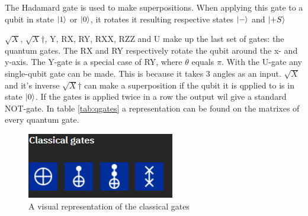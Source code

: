 The Hadamard gate is used to make superpositions. When applying this gate to a qubit in state $\ket{1}$ or $\ket{0}$, it rotates it resulting respective states $\ket{-}$ and $\ket{+S}$

$\sqrt{X}$, $\sqrt{X}$$\dagger$, Y, RX, RY, RXX, RZZ and U make up the last set of gates: the quantum gates. 
The RX and RY respectively rotate the qubit around the x- and y-axis. The Y-gate is a special case of RY, where $\theta$ equals $\pi$.
With the U-gate any single-qubit gate can be made. This is because it takes 3 angles as an input.
$\sqrt{X}$ and it's inverse $\sqrt{X}$$\dagger$ can make a superposition if the qubit it is qpplied to is in state $\ket{0}$. If the gates is applied twice in a row the output wil give a standard NOT-gate.
In table \ref{tab:qgates} a representation can be found on the matrixes of every quantum gate.

\begin{figure} [h]
    \centering
    \includegraphics[width=\textwidth]{img/classical-gates.PNG}
        \caption{A visual representation of the classical gates}
        \label{fig:classical gates}
\end{figure}

